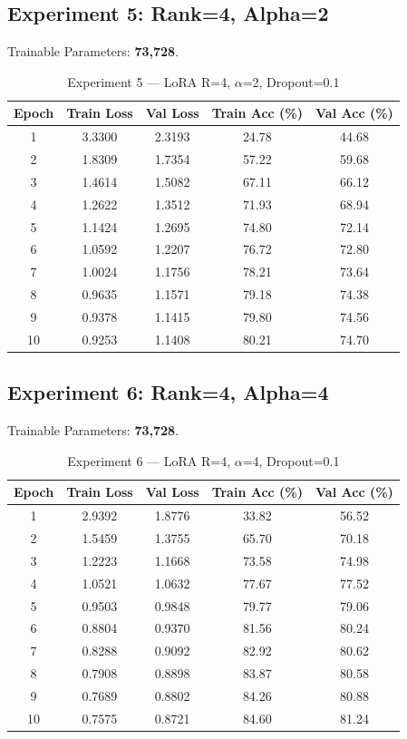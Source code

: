 \documentclass[12pt,a4paper]{article}
\begin{document}
\subsection{Experiment 5: Rank=4, Alpha=2}
Trainable Parameters: \textbf{73,728}.

\begin{table}[H]
\centering
\caption{Experiment 5 --- LoRA R=4, $\alpha$=2, Dropout=0.1}
\small
\begin{tabular}{ccccc}
\toprule
Epoch & Train Loss & Val Loss & Train Acc (\%) & Val Acc (\%) \\
\midrule
1  & 3.3300 & 2.3193 & 24.78 & 44.68 \\
2  & 1.8309 & 1.7354 & 57.22 & 59.68 \\
3  & 1.4614 & 1.5082 & 67.11 & 66.12 \\
4  & 1.2622 & 1.3512 & 71.93 & 68.94 \\
5  & 1.1424 & 1.2695 & 74.80 & 72.14 \\
6  & 1.0592 & 1.2207 & 76.72 & 72.80 \\
7  & 1.0024 & 1.1756 & 78.21 & 73.64 \\
8  & 0.9635 & 1.1571 & 79.18 & 74.38 \\
9  & 0.9378 & 1.1415 & 79.80 & 74.56 \\
10 & 0.9253 & 1.1408 & 80.21 & 74.70 \\
\bottomrule
\end{tabular}
\end{table}

\subsection{Experiment 6: Rank=4, Alpha=4}
Trainable Parameters: \textbf{73,728}.

\begin{table}[H]
\centering
\caption{Experiment 6 --- LoRA R=4, $\alpha$=4, Dropout=0.1}
\small
\begin{tabular}{ccccc}
\toprule
Epoch & Train Loss & Val Loss & Train Acc (\%) & Val Acc (\%) \\
\midrule
1  & 2.9392 & 1.8776 & 33.82 & 56.52 \\
2  & 1.5459 & 1.3755 & 65.70 & 70.18 \\
3  & 1.2223 & 1.1668 & 73.58 & 74.98 \\
4  & 1.0521 & 1.0632 & 77.67 & 77.52 \\
5  & 0.9503 & 0.9848 & 79.77 & 79.06 \\
6  & 0.8804 & 0.9370 & 81.56 & 80.24 \\
7  & 0.8288 & 0.9092 & 82.92 & 80.62 \\
8  & 0.7908 & 0.8898 & 83.87 & 80.58 \\
9  & 0.7689 & 0.8802 & 84.26 & 80.88 \\
10 & 0.7575 & 0.8721 & 84.60 & 81.24 \\
\bottomrule
\end{tabular}
\end{table}
\end{document}

